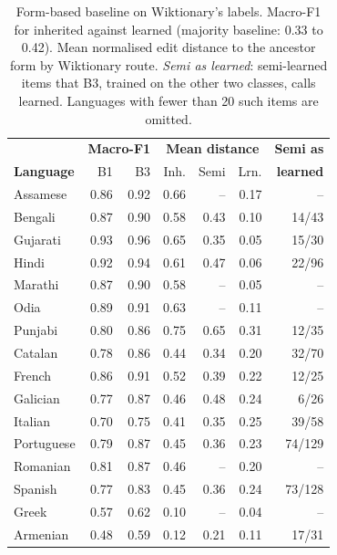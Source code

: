 \documentclass[11pt]{article}
\begin{document}
\begin{table}[t]
\centering\small
\setlength{\tabcolsep}{3.5pt}
\begin{tabular}{lrrrrrr}
\toprule
& \multicolumn{2}{c}{\textbf{Macro-F1}} & \multicolumn{3}{c}{\textbf{Mean distance}} & \textbf{Semi as} \\
\textbf{Language} & B1 & B3 & Inh. & Semi & Lrn. & \textbf{learned} \\
\midrule
Assamese & 0.86 & 0.92 & 0.66 & -- & 0.17 & -- \\
Bengali & 0.87 & 0.90 & 0.58 & 0.43 & 0.10 & 14/43 \\
Gujarati & 0.93 & 0.96 & 0.65 & 0.35 & 0.05 & 15/30 \\
Hindi & 0.92 & 0.94 & 0.61 & 0.47 & 0.06 & 22/96 \\
Marathi & 0.87 & 0.90 & 0.58 & -- & 0.05 & -- \\
Odia & 0.89 & 0.91 & 0.63 & -- & 0.11 & -- \\
Punjabi & 0.80 & 0.86 & 0.75 & 0.65 & 0.31 & 12/35 \\
\midrule
Catalan & 0.78 & 0.86 & 0.44 & 0.34 & 0.20 & 32/70 \\
French & 0.86 & 0.91 & 0.52 & 0.39 & 0.22 & 12/25 \\
Galician & 0.77 & 0.87 & 0.46 & 0.48 & 0.24 & 6/26 \\
Italian & 0.70 & 0.75 & 0.41 & 0.35 & 0.25 & 39/58 \\
Portuguese & 0.79 & 0.87 & 0.45 & 0.36 & 0.23 & 74/129 \\
Romanian & 0.81 & 0.87 & 0.46 & -- & 0.20 & -- \\
Spanish & 0.77 & 0.83 & 0.45 & 0.36 & 0.24 & 73/128 \\
\midrule
Greek & 0.57 & 0.62 & 0.10 & -- & 0.04 & -- \\
\midrule
Armenian & 0.48 & 0.59 & 0.12 & 0.21 & 0.11 & 17/31 \\
\bottomrule
\end{tabular}
\caption{Form-based baseline on Wiktionary's labels. Macro-F1 for inherited against learned (majority baseline: 0.33 to 0.42). Mean normalised edit distance to the ancestor form by Wiktionary route. \textit{Semi as learned}: semi-learned items that B3, trained on the other two classes, calls learned. Languages with fewer than 20 such items are omitted.}
\label{tab:baseline}
\end{table}
\end{document}
